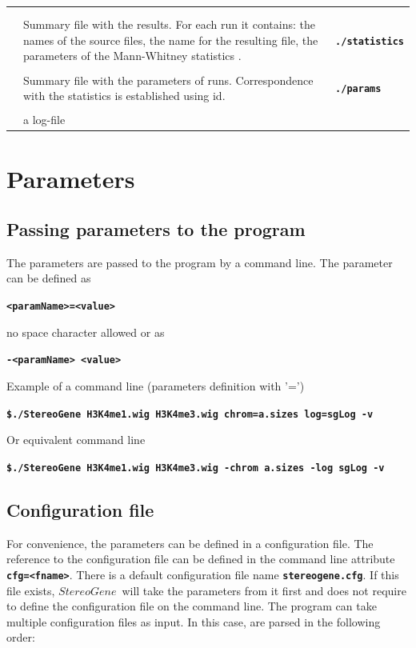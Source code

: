 \documentclass{article}
\newcommand{\prm}[1]{\texttt{\textbf{{#1}}}}
\newcommand{\sg}{$StereoGene$\ }
\newcounter{rowc}
\newcommand{\cw}{3.5cm}
\newcommand{\rc}[1]
 {\ifthenelse{\isodd{\value{rowc}}}
 {\\ \rowcolor{ltgray} }
 {\\}
 \begin{minipage}{\cw}\prm{#1}\end{minipage}
\stepcounter{rowc}
}
\begin{document}
\begin{longtable}{p{5cm}p{8cm}p{3cm}}
\rc{statistics}	&
	Summary file with the results. For each run it contains: the names of the source files, the name
	 for the resulting file, the parameters of the Mann-Whitney statistics .
	 & \prm{./statistics}
\rc{parameters}	&
	Summary file with the parameters of runs. Correspondence with the statistics  is established using id.
	& \prm{./params}
\rc{log} &
	a log-file &\\\hline
\end{longtable}

\section{Parameters}

\subsection{Passing parameters to the program}
The parameters are passed to the program by a command line. The parameter can be defined as 
\begin{center}
\prm{<paramName>=<value>}
\end{center}
no space character allowed or as
\begin{center}
\prm{-<paramName> <value>}
\end{center}
Example of a command line (parameters definition with '=')
\begin{center}
\prm{\$./StereoGene H3K4me1.wig H3K4me3.wig chrom=a.sizes log=sgLog -v}
\end{center}
Or equivalent command line
\begin{center}
\prm{\$./StereoGene H3K4me1.wig H3K4me3.wig -chrom a.sizes -log sgLog -v}
\end{center}


\subsection{Configuration file}\label{cfg}
For convenience, the parameters can be defined in a configuration file.  The reference to the configuration file can be defined in the command line attribute \prm{cfg=<fname>}. There is a default configuration file name \prm{stereogene.cfg}. If this file exists, \sg will take the parameters from it first and does not require to define the configuration file on the command line. The program can take multiple configuration files as input. In this case,  are parsed in the following order:
\end{document}
